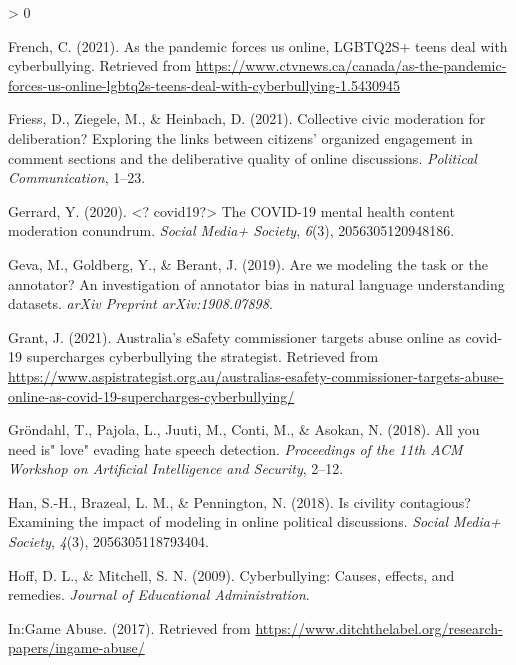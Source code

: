 \documentclass[
  10pt,
  dvipsnames,enabledeprecatedfontcommands]{scrartcl}
\newlength{\cslhangindent}
\newenvironment{CSLReferences}[2] %
 {%
  \setlength{\parindent}{0pt}
  \ifodd #1 \everypar{\setlength{\hangindent}{\cslhangindent}}\ignorespaces\fi
  \ifnum #2 > 0
  \setlength{\parskip}{#2\baselineskip}
  \fi
 }%
 {}
\begin{document}
\begin{CSLReferences}{1}{0}
\leavevmode\hypertarget{ref-french_as_2021}{}%
French, C. (2021). As the pandemic forces us online, {LGBTQ2S}+ teens
deal with cyberbullying. Retrieved from
\url{https://www.ctvnews.ca/canada/as-the-pandemic-forces-us-online-lgbtq2s-teens-deal-with-cyberbullying-1.5430945}

\leavevmode\hypertarget{ref-friess2021collective}{}%
Friess, D., Ziegele, M., \& Heinbach, D. (2021). Collective civic
moderation for deliberation? Exploring the links between citizens'
organized engagement in comment sections and the deliberative quality of
online discussions. \emph{Political Communication}, 1--23.

\leavevmode\hypertarget{ref-gerrard2020covid19}{}%
Gerrard, Y. (2020). \textless? covid19?\textgreater{} The COVID-19
mental health content moderation conundrum. \emph{Social Media+
Society}, \emph{6}(3), 2056305120948186.

\leavevmode\hypertarget{ref-geva2019we}{}%
Geva, M., Goldberg, Y., \& Berant, J. (2019). Are we modeling the task
or the annotator? An investigation of annotator bias in natural language
understanding datasets. \emph{arXiv Preprint arXiv:1908.07898}.

\leavevmode\hypertarget{ref-grant_2021}{}%
Grant, J. (2021). Australia's eSafety commissioner targets abuse online
as covid-19 supercharges cyberbullying \textbar{} the strategist.
Retrieved from
\url{https://www.aspistrategist.org.au/australias-esafety-commissioner-targets-abuse-online-as-covid-19-supercharges-cyberbullying/}

\leavevmode\hypertarget{ref-grondahl2018all}{}%
Gröndahl, T., Pajola, L., Juuti, M., Conti, M., \& Asokan, N. (2018).
All you need is" love" evading hate speech detection. \emph{Proceedings
of the 11th ACM Workshop on Artificial Intelligence and Security},
2--12.

\leavevmode\hypertarget{ref-han2018civility}{}%
Han, S.-H., Brazeal, L. M., \& Pennington, N. (2018). Is civility
contagious? Examining the impact of modeling in online political
discussions. \emph{Social Media+ Society}, \emph{4}(3),
2056305118793404.

\leavevmode\hypertarget{ref-hoff2009cyberbullying}{}%
Hoff, D. L., \& Mitchell, S. N. (2009). Cyberbullying: Causes, effects,
and remedies. \emph{Journal of Educational Administration}.

\leavevmode\hypertarget{ref-noauthor_:game_nodate}{}%
In:{Game} {Abuse}. (2017). Retrieved from
\url{https://www.ditchthelabel.org/research-papers/ingame-abuse/}


\end{CSLReferences}
\end{document}
